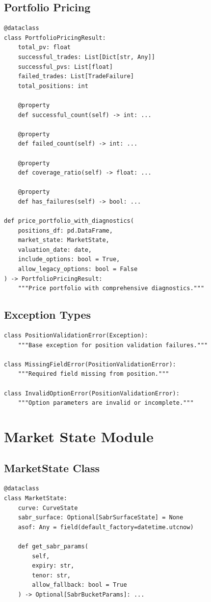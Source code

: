 \documentclass[12pt,a4paper]{report}
\begin{document}
\subsection{Portfolio Pricing}

\begin{lstlisting}
@dataclass
class PortfolioPricingResult:
    total_pv: float
    successful_trades: List[Dict[str, Any]]
    successful_pvs: List[float]
    failed_trades: List[TradeFailure]
    total_positions: int
    
    @property
    def successful_count(self) -> int: ...
    
    @property
    def failed_count(self) -> int: ...
    
    @property
    def coverage_ratio(self) -> float: ...
    
    @property
    def has_failures(self) -> bool: ...

def price_portfolio_with_diagnostics(
    positions_df: pd.DataFrame,
    market_state: MarketState,
    valuation_date: date,
    include_options: bool = True,
    allow_legacy_options: bool = False
) -> PortfolioPricingResult:
    """Price portfolio with comprehensive diagnostics."""
\end{lstlisting}

\subsection{Exception Types}

\begin{lstlisting}
class PositionValidationError(Exception):
    """Base exception for position validation failures."""

class MissingFieldError(PositionValidationError):
    """Required field missing from position."""

class InvalidOptionError(PositionValidationError):
    """Option parameters are invalid or incomplete."""
\end{lstlisting}

\section{Market State Module}

\subsection{MarketState Class}

\begin{lstlisting}
@dataclass
class MarketState:
    curve: CurveState
    sabr_surface: Optional[SabrSurfaceState] = None
    asof: Any = field(default_factory=datetime.utcnow)
    
    def get_sabr_params(
        self,
        expiry: str,
        tenor: str,
        allow_fallback: bool = True
    ) -> Optional[SabrBucketParams]: ...
\end{lstlisting}
\end{document}
